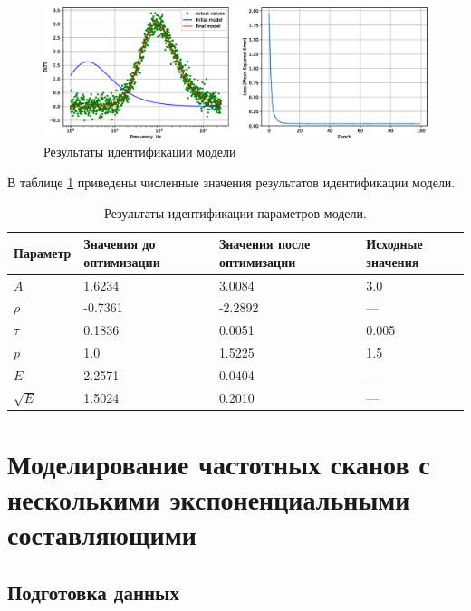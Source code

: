 \documentclass{report}
\begin{document}
        \begin{figure}[ht]
            \centering
            \includegraphics[width=\textwidth]{p_SGD}
            \caption{Результаты идентификации модели}
            \label{pic:pic4}
        \end{figure}

        В таблице \ref{table:table6} приведены численные значения результатов 
        идентификации модели.

        \begin{table}[ht]
            \caption{Результаты идентификации параметров модели.}
            \label{table:table6}
            \centering
            \begin{tabular}{ | m{2.5cm} | m{2.5cm} | m{2.5cm} | m{2.5cm} | }
                \hline
                Параметр & Значения до оптимизации & Значения после оптимизации & Исходные значения \\
                \hline
                $A$ & 1.6234 & 3.0084 & 3.0\\
                \hline
                $\rho$ & -0.7361 & -2.2892 & --- \\
                \hline
                $\tau$ & 0.1836 & 0.0051 & 0.005 \\
                \hline
                $p$ & 1.0 & 1.5225 & 1.5 \\
                \hline
                $E$ & 2.2571 & 0.0404 & --- \\
                \hline
                $\sqrt{E}$ & 1.5024 & 0.2010 & ---\\
                \hline
            \end{tabular}
        \end{table}


        \chapter{Моделирование частотных сканов с несколькими экспоненциальными составляющими}

        \section{Подготовка данных}
        







    
    \printbibliography
\end{document}
